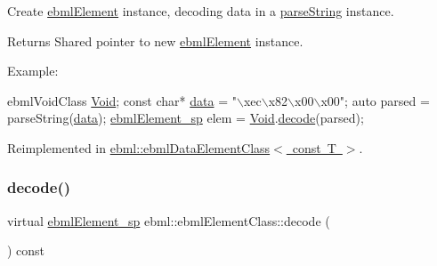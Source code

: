 Create \mbox{\hyperlink{classebml_1_1ebmlElement}{ebml\+Element}} instance, decoding data in a \mbox{\hyperlink{classebml_1_1parseString}{parse\+String}} instance.

\begin{DoxyReturn}{Returns}
Shared pointer to new \mbox{\hyperlink{classebml_1_1ebmlElement}{ebml\+Element}} instance.
\end{DoxyReturn}
Example\+: 
\begin{DoxyCode}
ebmlVoidClass \mbox{\hyperlink{namespaceebml_afbfd509d1cb71e416a07253746e886e9}{Void}};
\textcolor{keyword}{const} \textcolor{keywordtype}{char}* \mbox{\hyperlink{namespaceebml_a6365629b3110a3c5d0cde94d08aac26c}{data}} = \textcolor{stringliteral}{"\(\backslash\)xec\(\backslash\)x82\(\backslash\)x00\(\backslash\)x00"};
\textcolor{keyword}{auto} parsed = parseString(\mbox{\hyperlink{namespaceebml_a6365629b3110a3c5d0cde94d08aac26c}{data}});
\mbox{\hyperlink{namespaceebml_adad533b7705a16bb360fe56380c5e7be}{ebmlElement\_sp}} elem = \mbox{\hyperlink{namespaceebml_afbfd509d1cb71e416a07253746e886e9}{Void}}.\mbox{\hyperlink{classebml_1_1ebmlElementClass_a9bda26f54e5d5a1e27aaaf0e124ec457}{decode}}(parsed);
\end{DoxyCode}
 

Reimplemented in \mbox{\hyperlink{classebml_1_1ebmlDataElementClass_3_01const_01T_01_4_a02806c600c51c291303fbac56d9db70a}{ebml\+::ebml\+Data\+Element\+Class$<$ const T $>$}}.

\mbox{\label{classebml_1_1ebmlElementClass_a94461f09e1c1c57ffe86febb9710edc7}} 
\subsubsection{\texorpdfstring{decode()}{decode()}\hspace{0.1cm}{\footnotesize\ttfamily [2/6]}}
{\footnotesize\ttfamily virtual \mbox{\hyperlink{namespaceebml_adad533b7705a16bb360fe56380c5e7be}{ebml\+Element\+\_\+sp}} ebml\+::ebml\+Element\+Class\+::decode (\begin{DoxyParamCaption}\item[{const \mbox{\hyperlink{classebml_1_1parseFile}{parse\+File}} \&}]{ }\end{DoxyParamCaption}) const\hspace{0.3cm}{\ttfamily [virtual]}}

